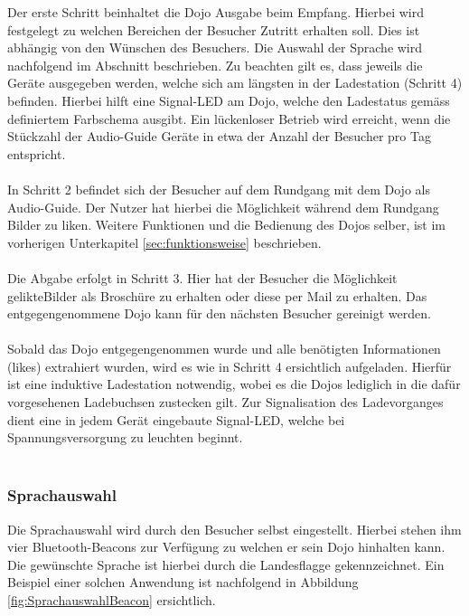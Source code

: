 Der erste Schritt beinhaltet die Dojo Ausgabe beim Empfang. Hierbei wird festgelegt zu welchen Bereichen der Besucher Zutritt erhalten soll. Dies ist abhängig von den Wünschen des Besuchers. Die Auswahl der Sprache wird nachfolgend im Abschnitt  beschrieben. Zu beachten gilt es, dass jeweils die Geräte ausgegeben werden, welche sich am längsten in der Ladestation (Schritt 4) befinden. Hierbei hilft eine Signal-LED am Dojo, welche den Ladestatus gemäss definiertem Farbschema ausgibt. Ein lückenloser Betrieb wird erreicht, wenn die Stückzahl der Audio-Guide Geräte in etwa der Anzahl der Besucher pro Tag entspricht.
\\
\\
In Schritt 2 befindet sich der Besucher auf dem Rundgang mit dem Dojo als Audio-Guide. Der Nutzer hat hierbei die Möglichkeit während dem Rundgang Bilder zu \glqq liken\grqq . Weitere Funktionen und die Bedienung des Dojos selber, ist im vorherigen Unterkapitel \ref{sec:funktionsweise} beschrieben.
\\
\\
Die Abgabe erfolgt in Schritt 3. Hier hat der Besucher die Möglichkeit \glqq gelikte\grqq Bilder als Broschüre zu erhalten oder diese per Mail zu erhalten. Das entgegengenommene Dojo kann für den nächsten Besucher gereinigt werden.
\\
\\
Sobald das Dojo entgegengenommen wurde und alle benötigten Informationen (\glqq likes\grqq) extrahiert wurden, wird es wie in Schritt 4 ersichtlich aufgeladen. Hierfür ist eine induktive Ladestation notwendig, wobei es die Dojos lediglich in die dafür vorgesehenen Ladebuchsen zustecken gilt. Zur Signalisation des Ladevorganges dient eine in jedem Gerät eingebaute Signal-LED, welche bei Spannungsversorgung zu leuchten beginnt.
\\
\\
\subsubsection*{Sprachauswahl} \label{sec:sprachauswahl}

Die Sprachauswahl wird durch den Besucher selbst eingestellt. Hierbei stehen ihm vier Bluetooth-Beacons zur Verfügung zu welchen er sein Dojo hinhalten kann. Die gewünschte Sprache ist hierbei durch die Landesflagge gekennzeichnet. Ein Beispiel einer solchen Anwendung ist nachfolgend in Abbildung \ref{fig:SprachauswahlBeacon} ersichtlich.

